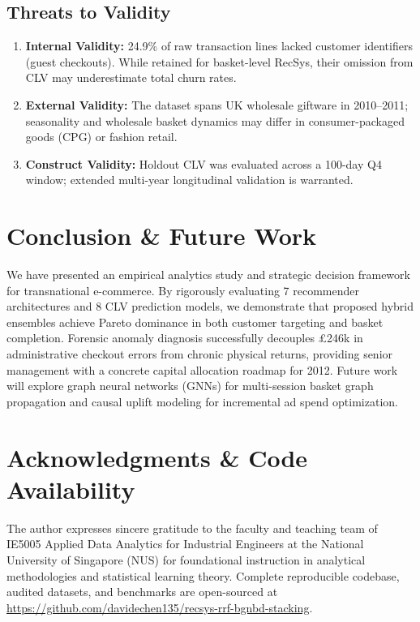 \documentclass[sigconf,nonacm]{acmart}
\begin{document}
\subsection{Threats to Validity}
\begin{enumerate}
    \item \textbf{Internal Validity:} 24.9\% of raw transaction lines lacked customer identifiers (guest checkouts). While retained for basket-level RecSys, their omission from CLV may underestimate total churn rates.
    \item \textbf{External Validity:} The dataset spans UK wholesale giftware in 2010--2011; seasonality and wholesale basket dynamics may differ in consumer-packaged goods (CPG) or fashion retail.
    \item \textbf{Construct Validity:} Holdout CLV was evaluated across a 100-day Q4 window; extended multi-year longitudinal validation is warranted.
\end{enumerate}

\section{Conclusion \& Future Work}
We have presented an empirical analytics study and strategic decision framework for transnational e-commerce. By rigorously evaluating 7 recommender architectures and 8 CLV prediction models, we demonstrate that proposed hybrid ensembles achieve Pareto dominance in both customer targeting and basket completion. Forensic anomaly diagnosis successfully decouples £246k in administrative checkout errors from chronic physical returns, providing senior management with a concrete capital allocation roadmap for 2012. Future work will explore graph neural networks (GNNs) for multi-session basket graph propagation and causal uplift modeling for incremental ad spend optimization.

\section*{Acknowledgments \& Code Availability}
The author expresses sincere gratitude to the faculty and teaching team of IE5005 Applied Data Analytics for Industrial Engineers at the National University of Singapore (NUS) for foundational instruction in analytical methodologies and statistical learning theory. Complete reproducible codebase, audited datasets, and benchmarks are open-sourced at \url{https://github.com/davidechen135/recsys-rrf-bgnbd-stacking}.



\end{document}
